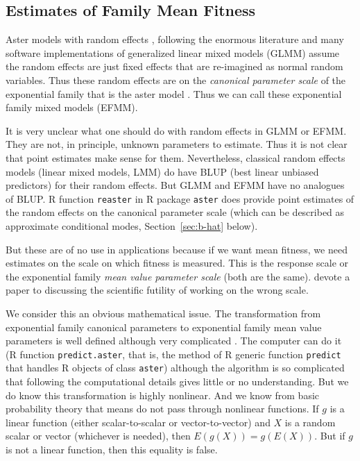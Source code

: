 \documentclass[11pt]{article}
\let\code=\texttt
\begin{document}
\subsection{Estimates of Family Mean Fitness} \label{sec:moo}

Aster models with random effects \citep{reaster}, following the enormous
literature and many software implementations of generalized linear mixed models
(GLMM) assume the random effects are just fixed effects that are re-imagined
as normal random variables.  Thus these random effects are on the
\emph{canonical parameter scale} of the exponential family that is the aster
model \citep{aster,reaster}.  Thus we can call these exponential family
mixed models (EFMM).

It is very unclear what one should do with random effects in GLMM or EFMM.
They are not, in principle, unknown parameters to estimate.
Thus it is not clear that point estimates make sense for them.
Nevertheless, classical random effects models (linear mixed models, LMM)
do have BLUP (best linear unbiased predictors) for their random effects.
But GLMM and EFMM have no analogues of BLUP.
R function \code{reaster} in R package \code{aster} \citep{aster-package}
does provide point estimates of the random effects on the canonical parameter
scale (which can be described as approximate conditional modes,
Section~\ref{sec:b-hat} below).

But these are of no use in applications because if we want mean fitness,
we need estimates on the scale on which fitness is measured.  This is the
response scale or the exponential family \emph{mean value parameter scale}
(both are the same).
\citet{stanton-thiede} devote a paper to discussing the scientific futility
of working on the wrong scale.

We consider this an obvious mathematical issue.
The transformation from exponential family canonical parameters to
exponential family mean value parameters is well defined although
very complicated \citep[Sections~1.18 through~1.22]{aster-theory}.
The computer can do it (R function \code{predict.aster}, that is,
the method of R generic function \code{predict} that handles R objects
of class \code{aster}) although the algorithm is so complicated that
following the computational details gives little or no understanding.
But we do know this transformation is highly nonlinear.
And we know from basic probability theory that means do not pass through
nonlinear functions.  If $g$ is a linear function (either scalar-to-scalar
or vector-to-vector) and $X$ is a random scalar or vector
(whichever is needed), then $E(g(X)) = g(E(X))$.
But if $g$ is not a linear function, then this equality is false.
\end{document}
